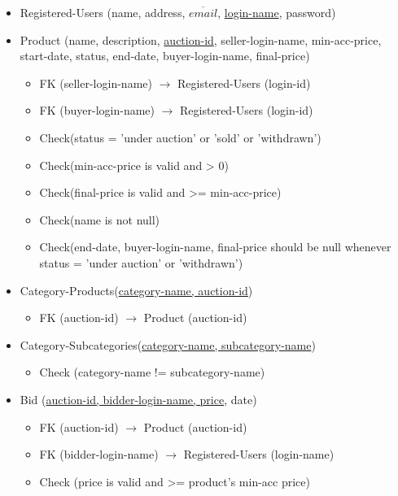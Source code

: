 \documentclass[a4paper]{article}
\begin{document}
\begin{itemize}
    \item Registered-Users (name, address, $\overline{email}$, \underline{login-name}, password)
    \item Product (name, description, \underline{auction-id}, seller-login-name, min-acc-price, start-date, status, end-date, buyer-login-name, final-price)
    \begin{itemize}
        \item FK (seller-login-name) $\rightarrow$ Registered-Users (login-id)
        \item FK (buyer-login-name) $\rightarrow$ Registered-Users (login-id)
        \item Check(status = 'under auction' or 'sold' or 'withdrawn')
        \item Check(min-acc-price is valid and > 0)
        \item Check(final-price is valid and >= min-acc-price)
        \item Check(name is not null)
        \item Check(end-date, buyer-login-name, final-price should be null whenever status = 'under auction' or 'withdrawn')
    \end{itemize}
    \item Category-Products(\underline{category-name, auction-id})
    \begin{itemize}
        \item FK (auction-id) $\rightarrow$ Product (auction-id)
    \end{itemize}
    \item Category-Subcategories(\underline{category-name, subcategory-name})
    \begin{itemize}
        \item Check (category-name != subcategory-name)
    \end{itemize}
    \item Bid (\underline{auction-id, bidder-login-name, price}, date)
    \begin{itemize}
        \item FK (auction-id) $\rightarrow$ Product (auction-id)
        \item FK (bidder-login-name) $\rightarrow$ Registered-Users (login-name)
        \item Check (price is valid and >= product's min-acc price)
    \end{itemize}
\end{itemize}
\end{document}
